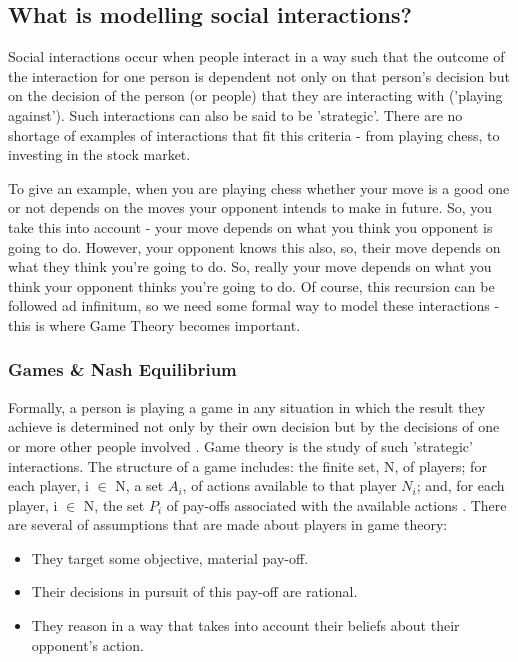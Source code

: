 \documentclass[12pt]{article}
\newcommand*{\np}{\par\noindent\newline}
\begin{document}
\subsection{What is modelling social interactions?}
Social interactions occur when people interact in a way such that the outcome
of the interaction for one person is dependent not  only on that person's
decision but on the decision of the person (or people) that they are interacting with ('playing against'). Such interactions can also be said to be
'strategic'. There are no shortage of examples of interactions that fit this
criteria - from playing chess, to investing in the stock market.
\np To give an example, when you are playing chess whether your move is a good
one or not depends on the moves your opponent intends to make in future. So,
you take this into account - your move depends on what you think you opponent
is going to do. However, your opponent knows this also, so, their move depends
on what they think you're going to do. So, really your move depends on what you
think your opponent thinks you're going to do. Of course, this recursion can be
followed ad infinitum, so we need some formal way to model these interactions
- this is where Game Theory becomes important.

\subsubsection{Games \& Nash Equilibrium}
Formally, a person is playing a game in any situation in which the result they
achieve is determined not only by their own decision but by the decisions of
one or more other people involved \cite{angner_course_2012}. Game theory is the
study of such 'strategic' interactions.
The structure of a game includes: the finite set, N, of players; for each
player, i $\in$ N, a set $A_i$, of actions available to that player
$N_i$; and, for each player, i $\in$ N, the set $P_i$ of
pay-offs associated with the available actions \cite{osborne_course_1994}.
There are several of assumptions that are made about players in game theory:
\begin{itemize}
    \item They target some objective, material pay-off.
    \item Their decisions in pursuit of this pay-off are rational.
    \item They reason in a way that takes into account their beliefs about their opponent's action. 
\end{itemize}
\end{document}
